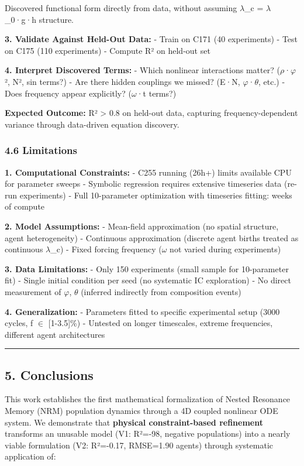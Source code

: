 \documentclass[
]{article}
\begin{document}
Discovered functional form directly from data, without assuming $\lambda$\_c =
$\lambda$\_0·g·h structure.

\textbf{3. Validate Against Held-Out Data:} - Train on C171 (40
experiments) - Test on C175 (110 experiments) - Compute R² on held-out
set

\textbf{4. Interpret Discovered Terms:} - Which nonlinear interactions
matter? ($\rho$·$\varphi$², N², sin terms?) - Are there hidden couplings we missed?
(E·N, $\varphi$·$\theta$, etc.) - Does frequency appear explicitly? ($\omega$·t terms?)

\textbf{Expected Outcome:} R² \textgreater{} 0.8 on held-out data,
capturing frequency-dependent variance through data-driven equation
discovery.

\subsubsection{4.6 Limitations}\label{limitations}

\textbf{1. Computational Constraints:} - C255 running (26h+) limits
available CPU for parameter sweeps - Symbolic regression requires
extensive timeseries data (re-run experiments) - Full 10-parameter
optimization with timeseries fitting: weeks of compute

\textbf{2. Model Assumptions:} - Mean-field approximation (no spatial
structure, agent heterogeneity) - Continuous approximation (discrete
agent births treated as continuous $\lambda$\_c) - Fixed forcing frequency ($\omega$
not varied during experiments)

\textbf{3. Data Limitations:} - Only 150 experiments (small sample for
10-parameter fit) - Single initial condition per seed (no systematic IC
exploration) - No direct measurement of $\varphi$, $\theta$ (inferred indirectly from
composition events)

\textbf{4. Generalization:} - Parameters fitted to specific experimental
setup (3000 cycles, f $\in$ {[}1-3.5{]}\%) - Untested on longer timescales,
extreme frequencies, different agent architectures

\begin{center}\rule{0.5\linewidth}{0.5pt}\end{center}

\subsection{5. Conclusions}\label{conclusions}

This work establishes the first mathematical formalization of Nested
Resonance Memory (NRM) population dynamics through a 4D coupled
nonlinear ODE system. We demonstrate that \textbf{physical
constraint-based refinement} transforms an unusable model (V1: R²=-98,
negative populations) into a nearly viable formulation (V2: R²=-0.17,
RMSE=1.90 agents) through systematic application of:
\end{document}
